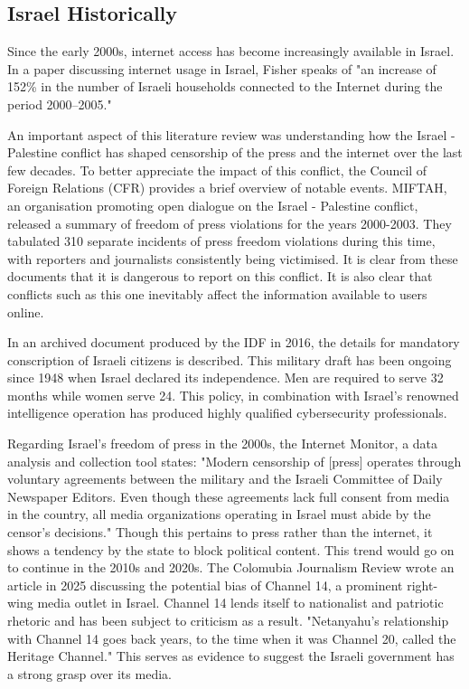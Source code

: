 \subsection{Israel Historically}
Since the early 2000s, internet access has become increasingly available in Israel. In a paper discussing internet usage in Israel, Fisher speaks of "an increase of 152\% in the number of Israeli households connected to the Internet during the period 2000–2005." \cite{FISHER2006984} 

An important aspect of this literature review was understanding how the Israel - Palestine conflict has shaped censorship of the press and the internet over the last few decades. To better appreciate the impact of this conflict, the Council of Foreign Relations (CFR) provides a brief overview of notable events. \cite{CFR2024Timeline} MIFTAH, an organisation promoting open dialogue on the Israel - Palestine conflict, released a summary of freedom of press violations for the years 2000-2003. They tabulated 310 separate incidents of press freedom violations during this time, with reporters and journalists consistently being victimised. \cite{Miftah2003Censorship} It is clear from these documents that it is dangerous to report on this conflict. It is also clear that conflicts such as this one inevitably affect the information available to users online.

In an archived document produced by the IDF in 2016, the details for mandatory conscription of Israeli citizens is described. \cite{MOIA2016IDF} This military draft has been ongoing since 1948 when Israel declared its independence. Men are required to serve 32 months while women serve 24. This policy, in combination with Israel's renowned intelligence operation has produced highly qualified cybersecurity professionals. 

Regarding Israel's freedom of press in the 2000s, the Internet Monitor, a data analysis and collection tool states: "Modern censorship of [press] operates through voluntary agreements between the military and the Israeli Committee of Daily Newspaper Editors. Even though these agreements lack full consent from media in the country, all media organizations operating in Israel must abide by the censor's decisions." \cite{internet_monitor_israel} Though this pertains to press rather than the internet, it shows a tendency by the state to block political content. This trend would go on to continue in the 2010s and 2020s. The Colomubia Journalism Review wrote an article in 2025 discussing the potential bias of Channel 14, a prominent right-wing media outlet in Israel. Channel 14 lends itself to nationalist and patriotic rhetoric and has been subject to criticism as a result. "Netanyahu’s relationship with Channel 14 goes back years, to the time when it was Channel 20, called the Heritage Channel." \cite{CJR2024IsraelChannel14} This serves as evidence to suggest the Israeli government has a strong grasp over its media. 

